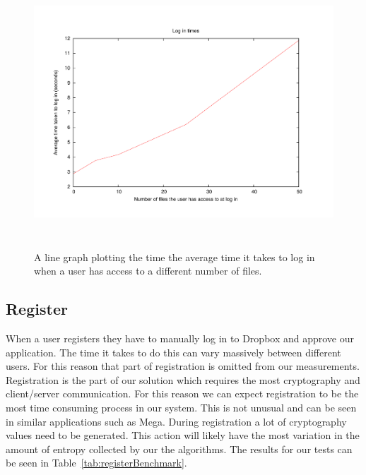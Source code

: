 \documentclass[12pt, titlepage]{article}
\begin{document}
\begin{figure}[!t]
\centerline{\includegraphics[height=4.0in,width=7in,angle=0]{plots/login/loginTimes.pdf}}
\caption{A line graph plotting the time the average time it takes to log in when a user has access to a different number of files.}
\label{fig:loginLineGraph}
\end{figure}


\subsection{Register}
When a user registers they have to manually log in to Dropbox and approve our application. The time it takes to do this can vary massively between different users. For this reason that part of registration is omitted from our measurements. 
\newline \indent Registration is the part of our solution which requires the most cryptography and client/server communication. For this reason we can expect registration to be the most time consuming process in our system. This is not unusual and can be seen in similar applications such as Mega.
\newline \indent During registration a lot of cryptography values need to be generated. This action will likely have the most variation in the amount of entropy collected by our the algorithms.
\newline \indent The results for our tests can be seen in Table~\ref{tab:registerBenchmark}. 
\end{document}
